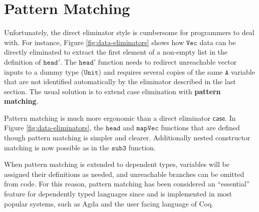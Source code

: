 
\section{Pattern Matching}

Unfortunately, the direct eliminator style is cumbersome for programmers to deal with.
For instance, Figure \ref{fig:data-eliminators} shows how $\mathtt{Vec}$ data can be directly eliminated to extract the first element of a non-empty list in the definition of $\mathtt{head'}$.
The $\mathtt{head'}$ function needs to redirect unreachable vector inputs to a dummy type ($\mathtt{Unit}$) and requires several copies of the same $\mathtt{A}$ variable that are not identified automatically by the eliminator described in the last section.
The usual solution is to extend case elimination with \textbf{pattern matching}.
 
Pattern matching is much more ergonomic than a direct eliminator $\mathsf{case}$.
In Figure \ref{fig:data-eliminators}, the $\mathtt{head}$ and $\mathtt{mapVec}$ functions that are defined though pattern matching is simpler and clearer.
Additionally nested constructor matching is now possible as in the $\mathtt{sub3}$ function.

When pattern matching is extended to dependent types, variables will be assigned their definitions as needed, and unreachable branches can be omitted from code.
For this reason, pattern matching has been considered an ``essential'' feature for dependently typed languages since \cite{coquand1992pattern} and is implemented in most popular systems, such as Agda and the user facing language of Coq.



